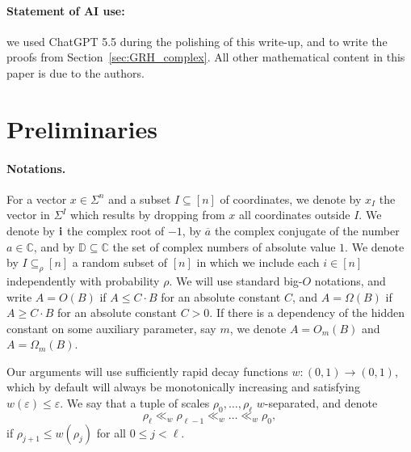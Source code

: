 \documentclass[10pt,a4paper]{amsart}
\newcommand\card[1]{\left| {#1} \right|}
\newcommand\eps{\varepsilon}
\renewcommand\geq{\geqslant}
\renewcommand\leq{\leqslant}
\begin{document}
\paragraph{Statement of AI use:} we used ChatGPT 5.5 during the polishing of this write-up, and to write the proofs from Section~\ref{sec:GRH_complex}.
All other mathematical content in this paper is due to the authors.
\section{Preliminaries}
\paragraph{Notations.} 
    For a vector $x\in \Sigma^n$ and a subset $I\subseteq [n]$ of coordinates, we denote by
 $x_I$ the vector in $\Sigma^{I}$ which results by dropping from $x$ all coordinates outside $I$. 
We denote by ${\bf i}$ the complex root of $-1$, by $\overline{a}$ the complex conjugate of the number $a\in\mathbb{C}$, and by $\mathbb{D}\subseteq\mathbb{C}$ the set of complex numbers of absolute value $1$.
We denote by $I\subseteq_{\rho}[n]$ a 
random subset of $[n]$ in which we include each $i\in[n]$ independently with probability $\rho$. We will use standard big-$O$ notations, and write $A = O(B)$ if $A\leq C\cdot B$ for an absolute constant $C$, and $A = \Omega(B)$ if $A\geq C\cdot B$ for an absolute constant $C>0$. If
there is a dependency of the hidden constant on some auxiliary parameter, say $m$, we denote $A = O_m(B)$
and $A = \Omega_m(B)$.

Our arguments will use sufficiently rapid decay functions $w\colon (0,1)\to(0,1)$, which by default will always be monotonically increasing and satisfying $w(\eps)\leq \eps$. 
We say that a tuple of scales 
$\rho_0,\ldots,\rho_{\ell}$ $w$-separated, and denote
\[
\rho_\ell\ll_w\rho_{\ell-1}\ll_w\ldots\ll_w\rho_0,
\]
if $\rho_{j+1}\leq w(\rho_j)$ for all $0\leq j<\ell$.
\end{document}
